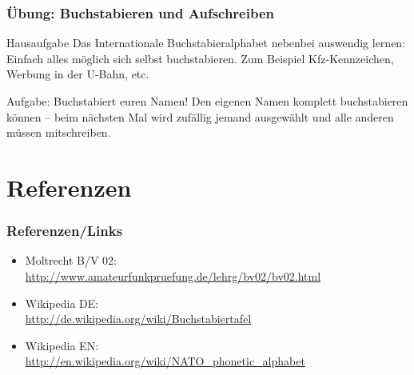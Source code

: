 \begin{frame}
    \frametitle{Übung: Buchstabieren und Aufschreiben}
    
    \begin{alertblock}{Hausaufgabe}
        Das Internationale Buchstabieralphabet nebenbei auswendig lernen:
        Einfach alles möglich sich selbst buchstabieren. Zum Beispiel
        Kfz-Kennzeichen, Werbung in der U-Bahn, etc.
    \end{alertblock}
 
    \begin{alertblock}{Aufgabe: Buchstabiert euren Namen!}
        Den eigenen Namen komplett buchstabieren können -- beim nächsten Mal
        wird zufällig jemand ausgewählt und alle anderen müssen mitschreiben.
    \end{alertblock}

\end{frame}

\section*{Referenzen}

\begin{frame}
    \frametitle{Referenzen/Links}
    
    \footnotesize
    \begin{itemize}
        \item Moltrecht B/V 02: \\
              \url{http://www.amateurfunkpruefung.de/lehrg/bv02/bv02.html}
        \item Wikipedia DE: \\
              \url{http://de.wikipedia.org/wiki/Buchstabiertafel}
        \item Wikipedia EN: \\
              \url{http://en.wikipedia.org/wiki/NATO_phonetic_alphabet}
    \end{itemize}

\end{frame}


